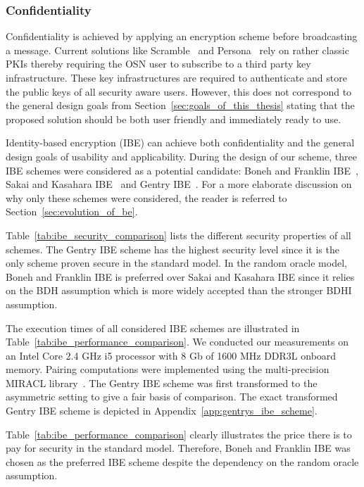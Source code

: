 \subsubsection{Confidentiality}
Confidentiality is achieved by applying an encryption scheme before broadcasting a message. Current solutions like Scramble~\cite{art:BeatoKW11} and Persona~\cite{art:BadenBSBS09} rely on rather classic PKIs thereby requiring the OSN user to subscribe to a third party key infrastructure. These key infrastructures are required to authenticate and store the public keys of all security aware users. However, this does not correspond to the general design goals from Section~\ref{sec:goals_of_this_thesis} stating that the proposed solution should be both user friendly and immediately ready to use.

Identity-based encryption (IBE) can achieve both confidentiality and the general design goals of usability and applicability. During the design of our scheme, three IBE schemes were considered as a potential candidate: Boneh and Franklin IBE~\cite{art:BonehF01}, Sakai and Kasahara IBE~\cite{art:SakaiK03} and Gentry IBE~\cite{art:Gentry06}. For a more elaborate discussion on why only these schemes were considered, the reader is referred to Section~\ref{sec:evolution_of_be}.

Table~\ref{tab:ibe_security_comparison} lists the different security properties of all schemes. The Gentry IBE scheme has the highest security level since it is the only scheme proven secure in the standard model. In the random oracle model, Boneh and Franklin IBE is preferred over Sakai and Kasahara IBE since it relies on the BDH assumption which is more widely accepted than the stronger BDHI assumption.

The execution times of all considered IBE schemes are illustrated in Table~\ref{tab:ibe_performance_comparison}. We conducted our measurements on an Intel Core 2.4 GHz i5 processor with 8 Gb of 1600 MHz DDR3L onboard memory. Pairing computations were implemented using the multi-precision MIRACL library~\cite{art:Scott03}. The Gentry IBE scheme was first transformed to the asymmetric setting to give a fair basis of comparison. The exact transformed Gentry IBE scheme is depicted in Appendix~\ref{app:gentrys_ibe_scheme}. 

Table~\ref{tab:ibe_performance_comparison} clearly illustrates the price there is to pay for security in the standard model. Therefore, Boneh and Franklin IBE was chosen as the preferred IBE scheme despite the dependency on the random oracle assumption.


